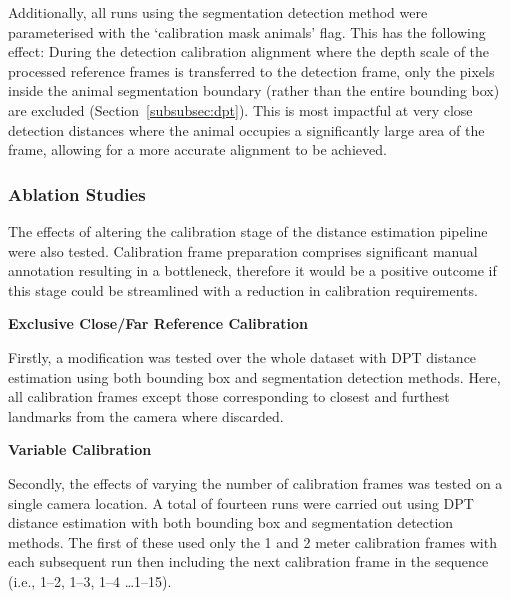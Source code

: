 Additionally, all runs using the segmentation detection method were parameterised with the
`calibration mask animals' flag.
This has the following effect:
During the detection calibration alignment where the depth scale of the processed reference frames
is transferred to the detection frame, only the pixels inside the animal segmentation boundary
(rather than the entire bounding box) are excluded (Section~\ref{subsubsec:dpt}).
This is most impactful at very close detection distances where the animal occupies a significantly
large area of the frame, allowing for a more accurate alignment to be achieved.

\clearpage

\subsubsection{Ablation Studies}

The effects of altering the calibration stage of the distance estimation pipeline were also tested.
Calibration frame preparation comprises significant manual annotation resulting in a bottleneck,
therefore it would be a positive outcome if this stage could be streamlined with a reduction in
calibration requirements.

\vspace{5mm}
\textbf{Exclusive Close/Far Reference Calibration}

Firstly, a modification was tested over the whole dataset with DPT distance estimation using both
bounding box and segmentation detection methods.
Here, all calibration frames except those corresponding to closest and furthest landmarks from the
camera where discarded.

\vspace{5mm}
\textbf{Variable Calibration}

Secondly, the effects of varying the number of calibration frames was tested on a single camera
location.
A total of fourteen runs were carried out using DPT distance estimation with both bounding box
and segmentation detection methods.
The first of these used only the 1 and 2 meter calibration frames with each subsequent run then including
the next calibration frame in the sequence (i.e., 1–2, 1–3, 1–4 \ldots 1–15).
